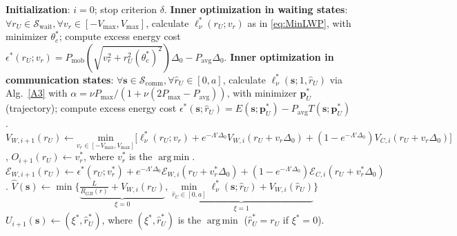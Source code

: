 \documentclass[12pt, draftcls, onecolumn]{IEEEtran}
\theoremstyle{plain}
\theoremstyle{definition}
\theoremstyle{remark}
\DeclareMathOperator*{\argmin}{arg\,min}
\begin{document}
\begin{algorithm} [t]
\caption{$(O^{*},U^{*},g(\nu),\bar{\mathcal E},V_{\cdot,0}^{next},\mathcal E_{\cdot,0}^{next})=\mathrm{VITER}(\nu,V_{\cdot,0},\mathcal E_{\cdot,0})$}\label{A1}
    \begin{algorithmic}[1]
        \scriptsize
        \State \textbf{Initialization}: $i{=}0$; stop criterion $\delta$.
        \State \textbf{Inner optimization in waiting states}: ${\forall}r_U{\in}\mathcal{S}_{\mathrm{wait}}, {\forall}v_{r}{\in}[-V_{\mathrm{max}},V_{\mathrm{max}}]$, calculate $\ell_{\nu}^{*}(r_U;v_{r})$ as in \eqref{eq:MinLWP}, with minimizer $\theta_{c}^{*}$; compute excess energy cost $\epsilon^{*}(r_U;v_{r}){=}
        P_{\mathrm{mob}}(\sqrt{v_{r}^{2} + r_U^2(\theta_c^*)^2})\Delta_0-P_{\mathrm{avg}}\Delta_0$.
    	\State \textbf{Inner optimization in communication states}: ${\forall}\mathbf{s}{\in}\mathcal{S}_{\mathrm{comm}}, {\forall}\hat{r}_{U}{\in}[0,a]$, calculate $\ell_{\nu}^{*}(\mathbf{s};1,\hat{r}_{U})$ via Alg.~\ref{A3} with
	 $\alpha=\nu P_{\max}/(1{+}\nu(2P_{\max}{-} P_{\mathrm{avg}}))$, with minimizer $\mathbf{p}_{U}^{*}$ (trajectory); compute excess energy cost $\epsilon^{*}(\mathbf{s};\hat{r}_{U}){=}E(\mathbf{s};\mathbf{p}_{U}^{*})-P_{\mathrm{avg}}T(\mathbf{s};\mathbf{p}_{U}^{*})$.
    	\Repeat
             
        	    \State $V_{W,i{+}1}(r_{U}){\gets}\underset{v_{r}{\in}[-V_{\mathrm{max}},V_{\mathrm{max}}]}{\mathrm{min}}\big[\ell_{\nu}^{*}(r_{U};v_{r}){+}e^{-\Lambda'\Delta_{0}}V_{W,i}(r_{U}{+}v_{r}\Delta_{0}){+} (1{-}e^{-\Lambda'\Delta_{0}})
	    V_{C,i}(r_{U}{+}v_{r}\Delta_{0})\big]$,
        		\State $O_{i{+}1}(r_{U})\gets v_r^*$, where $v_r^*$ is the $\argmin$.
        		\State $\mathcal E_{W,i{+}1}(r_{U}){\gets}\epsilon^{*}(r_{U};v_r^*){+}e^{-\Lambda'\Delta_{0}}\mathcal E_{W,i}(r_{U}{+}v_r^*\Delta_{0}){+}(1{-}e^{-\Lambda'\Delta_{0}})
		\mathcal E_{C,i}(r_{U}{+}v_r^*\Delta_{0})$.
        	\EndFor
        	\For{each $r{\in}[0,a]$, $\psi{\in}[0,2\pi)$ ($\mathbf s=(r_U,r,\psi)$)} 
        	    \State $\hat V(\mathbf{s}){\gets}\min\Big\{\underbrace{\frac{L}{R_{GB}(r)}{+}V_{W,i}({r}_{U})}_{\xi=0},
	    \underbrace{
	    \underset{\hat{r}_{U}{\in}[0,a]}{\min}\ell_{\nu}^{*}(\mathbf{s};\hat{r}_{U}){+}V_{W,i}(\hat{r}_{U})}_{\xi=1}\Big\}$
             \State $U_{i{+}1}(\mathbf{s})\gets (\xi^*,\hat r_U^*)$, where $(\xi^*,\hat r_U^*)$ is the $\argmin$ ($\hat r_U^*=r_U$ if $\xi^*=0$).

\end{algorithmic}
\end{algorithm}
\end{document}
